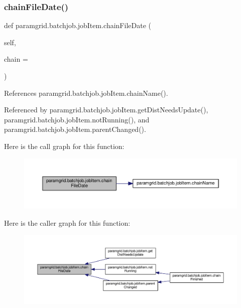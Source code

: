 \subsubsection{\texorpdfstring{chain\+File\+Date()}{chainFileDate()}}
{\footnotesize\ttfamily def paramgrid.\+batchjob.\+job\+Item.\+chain\+File\+Date (\begin{DoxyParamCaption}\item[{}]{self,  }\item[{}]{chain = {} }\end{DoxyParamCaption})}



References paramgrid.\+batchjob.\+job\+Item.\+chain\+Name().



Referenced by paramgrid.\+batchjob.\+job\+Item.\+get\+Dist\+Needs\+Update(), paramgrid.\+batchjob.\+job\+Item.\+not\+Running(), and paramgrid.\+batchjob.\+job\+Item.\+parent\+Changed().

Here is the call graph for this function\+:
\nopagebreak
\begin{figure}[H]
\begin{center}
\leavevmode
\includegraphics[width=350pt]{classparamgrid_1_1batchjob_1_1jobItem_a6c477e458924df69f4d638a39e37a56c_cgraph}
\end{center}
\end{figure}
Here is the caller graph for this function\+:
\nopagebreak
\begin{figure}[H]
\begin{center}
\leavevmode
\includegraphics[width=350pt]{classparamgrid_1_1batchjob_1_1jobItem_a6c477e458924df69f4d638a39e37a56c_icgraph}
\end{center}
\end{figure}
\mbox{\label{classparamgrid_1_1batchjob_1_1jobItem_af5ab04f9c7520cac86ab2182b265979e}} 
